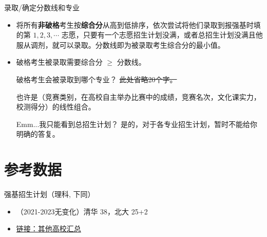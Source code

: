 \documentclass{beamer}
\begin{document}
\begin{frame}{录取/确定分数线和专业}
    \begin{itemize}
        \pause
        \item 将所有\textbf{非破格}考生按\textbf{综合分}从高到低排序，依次尝试将他们录取到报强基时填的第 $1, 2, 3, \cdots$ 志愿，只要有一个志愿招生计划没满，或者总招生计划没满且他服从调剂，就可以录取。分数线即为被录取考生综合分的最小值。
        \item 破格考生被录取需要综合分 $\geq$ 分数线。
        \pause
        \begin{exampleblock}{破格考生会被录取到哪个专业？}
        \sout{此处省略20个字。} \par
        也许是（竞赛类别，在高校自主举办比赛中的成绩，竞赛名次，文化课实力，校测得分）的线性组合。
        \end{exampleblock}
        \pause
        \begin{exampleblock}{Emm...我只能看到总招生计划？}
        是的，对于各专业招生计划，暂时不能给你明确的答复。
        \end{exampleblock}
    \end{itemize}
\end{frame}

\section{参考数据}

\begin{frame}{强基招生计划（理科, 下同）}
    \pause
    \begin{itemize}
        \item （2021-2023无变化）清华 38，北大 25+2
        \item \href{https://www.zizzs.com/c/202304/96296.html}{链接：其他高校汇总}
    \end{itemize}
\end{frame}
\end{document}
